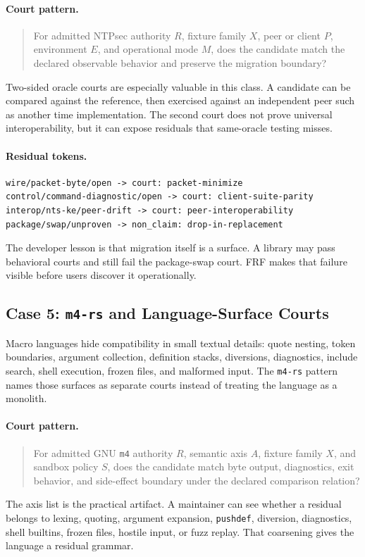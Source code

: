 \documentclass[11pt,a4paper]{article}
\newcommand{\frf}{\textsc{FRF}}
\begin{document}
\paragraph{Court pattern.}
\begin{quote}
For admitted NTPsec authority \(R\), fixture family \(X\), peer or client \(P\), environment \(E\), and operational mode \(M\), does the candidate match the declared observable behavior and preserve the migration boundary?
\end{quote}
Two-sided oracle courts are especially valuable in this class. A candidate can be compared against the reference, then exercised against an independent peer such as another time implementation. The second court does not prove universal interoperability, but it can expose residuals that same-oracle testing misses.

\paragraph{Residual tokens.}
\begin{verbatim}
wire/packet-byte/open -> court: packet-minimize
control/command-diagnostic/open -> court: client-suite-parity
interop/nts-ke/peer-drift -> court: peer-interoperability
package/swap/unproven -> non_claim: drop-in-replacement
\end{verbatim}
The developer lesson is that migration itself is a surface. A library may pass behavioral courts and still fail the package-swap court. \frf{} makes that failure visible before users discover it operationally.

\subsection{Case 5: \texttt{m4-rs} and Language-Surface Courts}

Macro languages hide compatibility in small textual details: quote nesting, token boundaries, argument collection, definition stacks, diversions, diagnostics, include search, shell execution, frozen files, and malformed input. The \texttt{m4-rs} pattern names those surfaces as separate courts instead of treating the language as a monolith.

\paragraph{Court pattern.}
\begin{quote}
For admitted GNU \texttt{m4} authority \(R\), semantic axis \(A\), fixture family \(X\), and sandbox policy \(S\), does the candidate match byte output, diagnostics, exit behavior, and side-effect boundary under the declared comparison relation?
\end{quote}
The axis list is the practical artifact. A maintainer can see whether a residual belongs to lexing, quoting, argument expansion, \texttt{pushdef}, diversion, diagnostics, shell builtins, frozen files, hostile input, or fuzz replay. That coarsening gives the language a residual grammar.
\end{document}
